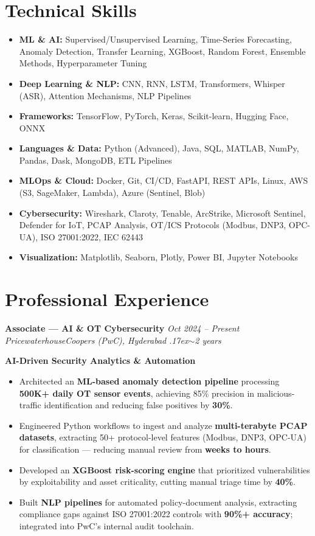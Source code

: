 \documentclass[10.5pt,a4paper]{article}
\newcommand{\expheader}[4]{%
  \textbf{#1} \hfill \textit{#2}\\
  \textit{#3} \hfill \textit{#4}\vspace{3pt}%
}
\newcommand{\subheading}[1]{\vspace{3pt}\textbf{#1}\vspace{1pt}}
\begin{document}
\section{Technical Skills}
\begin{itemize}
  \item \textbf{ML \& AI:} Supervised/Unsupervised Learning, Time-Series Forecasting, Anomaly Detection, Transfer Learning, XGBoost, Random Forest, Ensemble Methods, Hyperparameter Tuning
  \item \textbf{Deep Learning \& NLP:} CNN, RNN, LSTM, Transformers, Whisper (ASR), Attention Mechanisms, NLP Pipelines
  \item \textbf{Frameworks:} TensorFlow, PyTorch, Keras, Scikit-learn, Hugging Face, ONNX
  \item \textbf{Languages \& Data:} Python (Advanced), Java, SQL, MATLAB, NumPy, Pandas, Dask, MongoDB, ETL Pipelines
  \item \textbf{MLOps \& Cloud:} Docker, Git, CI/CD, FastAPI, REST APIs, Linux, AWS (S3, SageMaker, Lambda), Azure (Sentinel, Blob)
  \item \textbf{Cybersecurity:} Wireshark, Claroty, Tenable, ArcStrike, Microsoft Sentinel, Defender for IoT, PCAP Analysis, OT/ICS Protocols (Modbus, DNP3, OPC-UA), ISO 27001:2022, IEC 62443
  \item \textbf{Visualization:} Matplotlib, Seaborn, Plotly, Power BI, Jupyter Notebooks
\end{itemize}

\section{Professional Experience}
\expheader{Associate — AI \& OT Cybersecurity}{Oct 2024 -- Present}{PricewaterhouseCoopers (PwC), Hyderabad}{{\raise.17ex\hbox{$\scriptstyle\sim$}}2 years}

\subheading{AI-Driven Security Analytics \& Automation}
\begin{itemize}
  \item Architected an \textbf{ML-based anomaly detection pipeline} processing \textbf{500K+ daily OT sensor events}, achieving 85\% precision in malicious-traffic identification and reducing false positives by \textbf{30\%}.
  \item Engineered Python workflows to ingest and analyze \textbf{multi-terabyte PCAP datasets}, extracting 50+ protocol-level features (Modbus, DNP3, OPC-UA) for classification — reducing manual review from \textbf{weeks to hours}.
  \item Developed an \textbf{XGBoost risk-scoring engine} that prioritized vulnerabilities by exploitability and asset criticality, cutting manual triage time by \textbf{40\%}.
  \item Built \textbf{NLP pipelines} for automated policy-document analysis, extracting compliance gaps against ISO 27001:2022 controls with \textbf{90\%+ accuracy}; integrated into PwC's internal audit toolchain.
\end{itemize}
\end{document}
